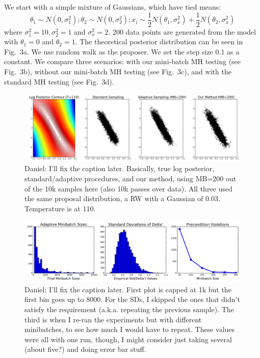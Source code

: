\documentclass{article}
\begin{document}
We start with a simple mixture of Gaussians, which have tied means:
\[
\theta_1 \sim N(0, \sigma_1^2); \theta_2 \sim N(0, \sigma_2^2); x_i \sim \frac{1}{2}N(\theta_1, \sigma_x^2) + \frac{1}{2} N(\theta_2, \sigma_x^2)
\]
where $\sigma_1^2 = 10, \sigma_2^2 = 1$ and $\sigma_x^2=2$. 200 data points are generated from the
model with $\theta_1 = 0$ and $\theta_2 = 1$. The theoretical posterior distribution can be seen in
Fig.~3a. We use random walk as the proposer. We set the step size 0.1 as a constant. We compare
three scenarios: with our mini-batch MH testing (see Fig.~3b), without our mini-batch MH testing
(see Fig.~3c), and with the standard MH testing (see Fig.~3d). 

\begin{figure}[t]
    \centering
    \includegraphics[width=1\linewidth]{cloud_v01.png}
    \caption{
    {\color{blue}
    Daniel: I'll fix the caption later. Basically, true log posterior, standard/adaptive procedures,
    and our method, using MB=200 out of the 10k samples here (also 10k passes over data). All three
    used the same proposal distribution, a RW with a Gaussian of 0.03. Temperature is at 110.
    }
    }
\end{figure}

\begin{figure}[t]
    \centering
    \includegraphics[width=1\linewidth]{adaptive_and_ours_information_v01.png}
    \caption{
    {\color{blue}
    Daniel: I'll fix the caption later. First plot is capped at 1k but the first bin goes up to
    8000. For the SDs, I skipped the ones that didn't satisfy the requirement (a.k.a. repeating the
    previous sample). The third is when I re-ran the experiments but with different minibatches, to
    see how much I would have to repeat. These values were all with one run, though, I might
    consider just taking several (about five?) and doing error bar stuff.
    }
    }
\end{figure}
\end{document}
